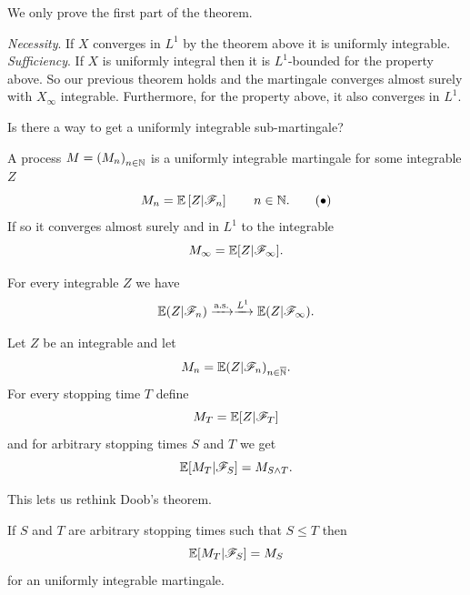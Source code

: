 \documentclass{report}
\begin{document}
We only prove the first part of the theorem.
\begin{fancyproof}
	\emph{Necessity}. If $X$ converges in $L^{1}$ by the theorem above it is uniformly integrable.\\
	\emph{Sufficiency}. If $X$ is uniformly integral then it is $L^{1}$-bounded for the property above. So our previous theorem holds and the martingale converges almost surely with $X_{\infty}$ integrable. Furthermore, for the property above, it also converges in $L^{1}$.
\end{fancyproof}
Is there a way to get a uniformly integrable sub-martingale?
\begin{theorem}
	A process $M={(M_{n})}_{n\in\mathbb{N}}$ is a uniformly integrable martingale \ifonly{} for some integrable \rv{} $Z$
	\begin{equation}
		M_{n}=\mathbb{E}\left[Z|\mathscr{F}_{n}\right]\qquad n\in\mathbb{N}.\tag{$\bullet$}\label{AAAA}
	\end{equation}
	If so it converges almost surely and in $L^{1}$ to the integrable \rv
	\begin{equation*}
		M_{\infty}=\mathbb{E}[Z|\mathscr{F}_{\infty}].
	\end{equation*}
\end{theorem}
\begin{corollary}
	For every integrable \rv{} $Z$ we have
	\begin{equation*}
		\mathbb{E}(Z|\mathscr{F}_{n})\xrightarrow[]{\text{a.s.}}\xrightarrow[]{L^{1}}\mathbb{E}(Z|\mathscr{F}_{\infty}).
	\end{equation*}
\end{corollary}
\begin{theorem}
	Let $Z$ be an integrable \rv{} and let 
	\begin{equation*}
		M_{n}=\mathbb{E}(Z|\mathscr{F}_{n})_{n\in\overline{\mathbb{N}}}.
	\end{equation*}
	For every stopping time $T$ define
	\begin{equation*}
		M_{T}=\mathbb{E}[Z|\mathscr{F}_{T}]
	\end{equation*}
	and for arbitrary stopping times $S$ and $T$ we get
	\begin{equation*}
		\mathbb{E}[M_{T}|\mathscr{F}_{S}]=M_{S\wedge T}.
	\end{equation*}
\end{theorem}
This lets us rethink Doob's theorem.
\begin{theorem}
	If $S$ and $T$ are arbitrary stopping times such that $S\leq T$ then
	\begin{equation*}
		\mathbb{E}[M_{T}|\mathscr{F}_{S}]=M_{S}
	\end{equation*}
	for an uniformly integrable martingale.
\end{theorem}
\end{document}
